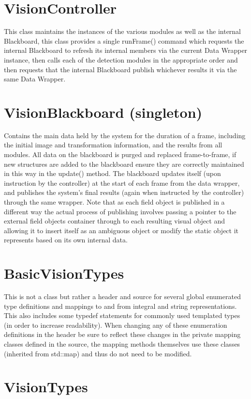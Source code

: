 \documentclass[]{report}
\begin{document}
\section{VisionController}
This class maintains the instances of the various modules as well as the internal Blackboard, this class provides a single runFrame() command which requests the internal Blackboard to refresh its internal members via the current Data Wrapper instance, then calls each of the detection modules in the appropriate order and then requests that the internal Blackboard publish whichever results it via the same Data Wrapper.

\section{VisionBlackboard (singleton)}
Contains the main data held by the system for the duration of a frame, including the initial image and transformation information, and the results from all modules. All data on the blackboard is purged and replaced frame-to-frame, if new structures are added to the blackboard ensure they are correctly maintained in this way in the update() method. The blackboard updates itself (upon instruction by the controller) at the start of each frame from the data wrapper, and publishes the system's final results (again when instructed by the controller) through the same wrapper. Note that as each field object is published in a different way the actual process of publishing involves passing a pointer to the external field objects container through to each resulting visual object and allowing it to insert itself as an ambiguous object or modify the static object it represents based on its own internal data.

\section{BasicVisionTypes}
This is not a class but rather a header and source for several global enumerated type definitions and mappings to and from integral and string representations. This also includes some typedef statements for commonly used templated types (in order to increase readability). When changing any of these enumeration definitions in the header be sure to reflect these changes in the private mapping classes defined in the source, the mapping methods themselves use these classes (inherited from std::map) and thus do not need to be modified.

\section{VisionTypes}
\end{document}
